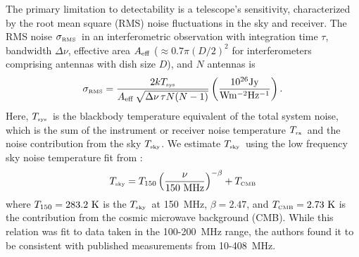 \documentclass[iop,numberedappendix,apj]{emulateapj}
\newcommand{\Tcmb}{\mbox{$T_{\mbox{\tiny CMB}}$}}
\newcommand{\Tsky}{\mbox{$T_{\mbox{\tiny sky}}$}}
\newcommand{\Tsys}{\mbox{$T_{\mbox{\tiny sys}}$}}
\newcommand{\Trx}{\mbox{$T_{\mbox{\tiny rx}}$}}
\newcommand{\sigRMS}{\mbox{$\sigma_{\mbox{\tiny RMS}}$}}
\begin{document}
The primary limitation to detectability is a telescope's sensitivity, characterized by the root mean square (RMS) noise fluctuations in the sky and receiver.
The RMS noise \sigRMS\ in an interferometric observation with integration time $\tau$, bandwidth $\Delta \nu$, effective area $A_{\rm eff}$ ($\approx0.7 \pi (D/2)^2$ for interferometers comprising antennas with dish size $D$), and $N$ antennas is \citep[see e.g.][]{condon+ransom2016}
\begin{equation}
\sigRMS = \frac{2 k \Tsys}{A_{\rm eff} \, \sqrt{\Delta \nu \, \tau N (N-1)}} 
\left(\frac{\rm 10^{26} Jy}{\rm W m^{-2} Hz^{-1}}\right).
\label{eq:rms_sens}
\end{equation}
Here, \Tsys\ is the blackbody temperature equivalent of the total system noise, which is the sum of the instrument or receiver noise temperature \Trx\ and the noise contribution from the sky \Tsky.
We estimate \Tsky\ using the low frequency sky noise temperature fit from \cite{Rogers+Bowman2008}:
\begin{equation}
\Tsky = T_{150} \left( \frac{\nu}{150~\rm MHz}\right)^{-\beta} + \Tcmb
\label{eq:Tsky}
\end{equation}
where $T_{150} = 283.2~\rm K$ is the \Tsky\ at 150~MHz, $\beta=2.47$, and $\Tcmb = 2.73~\rm K$ is the contribution from the cosmic microwave background (CMB).
While this relation was fit to data taken in the 100-200~MHz range, the authors found it to be consistent with published measurements from 10-408~MHz. 
\end{document}
